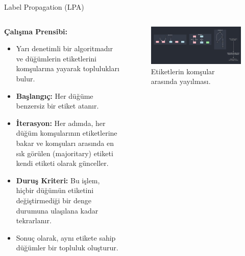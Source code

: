 \documentclass{beamer}
\begin{document}
\begin{frame}{Label Propagation (LPA)}
    \begin{columns}[T]
        \begin{column}{.5\textwidth}
            \textbf{Çalışma Prensibi:}
            \begin{itemize}
                \item Yarı denetimli bir algoritmadır ve düğümlerin etiketlerini komşularına yayarak toplulukları bulur.
                \item \textbf{Başlangıç:} Her düğüme benzersiz bir etiket atanır.
                \item \textbf{İterasyon:} Her adımda, her düğüm komşularının etiketlerine bakar ve komşuları arasında en sık görülen (majoritary) etiketi kendi etiketi olarak günceller.
                \item \textbf{Duruş Kriteri:} Bu işlem, hiçbir düğümün etiketini değiştirmediği bir denge durumuna ulaşılana kadar tekrarlanır.
                \item Sonuç olarak, aynı etikete sahip düğümler bir topluluk oluşturur.
            \end{itemize}
        \end{column}
        \begin{column}{.5\textwidth}
            \begin{figure}
                \includegraphics[width=\textwidth]{images/lpa_diagram.jpg}
                \caption{Etiketlerin komşular arasında yayılması.}
            \end{figure}
        \end{column}
    \end{columns}
\end{frame}
\end{document}
